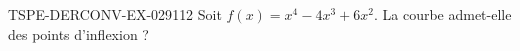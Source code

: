 \begin{exercice}{TSPE-DERCONV-EX-029}{1}{12}
Soit $f(x) = x^4 - 4x^3 + 6x^2$. La courbe admet-elle des points d'inflexion ?

\end{exercice}
